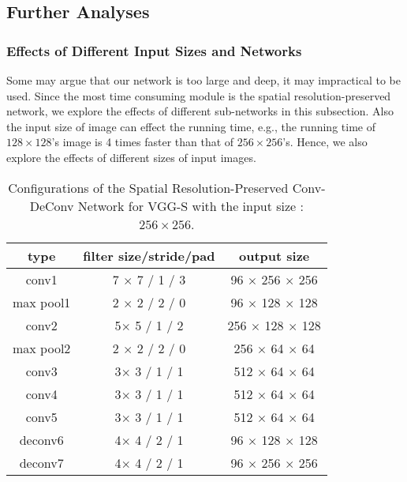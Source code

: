 \documentclass[journal]{IEEEtran}
\begin{document}
\subsection{Further Analyses}

\subsubsection{Effects of Different Input Sizes and Networks}
Some may argue that our network is too large and deep, it may impractical to be used. Since the most time consuming module is the spatial resolution-preserved network, we explore the effects of different sub-networks in this subsection. Also the input size of image can effect the running time, e.g., the running time of $128 \times 128$'s image is 4 times faster than that of $256 \times 256$'s. Hence, we also explore the effects of different sizes of input images.


\begin{table}[t]
    \centering \caption{Configurations of the Spatial Resolution-Preserved Conv-DeConv Network for VGG-S with the input size : $256 \times 256$.}
    \begin{tabular}{|c|c | c |}
        \hline{\bf type} &  {\bf filter size/stride/pad } & {\bf output size} \\
        \hline
         conv1 & 7 $\times$ 7 / 1 / 3 & 96 $\times$ 256 $\times$ 256 \\
           \hline
        max pool1 & 2 $\times$ 2 / 2 / 0  & 96 $\times$ 128 $\times$ 128 \\
         \hline
         conv2 & 5$\times$ 5 / 1 / 2  & 256 $\times$ 128 $\times$ 128 \\
         \hline
        max pool2 & 2 $\times$ 2 / 2 / 0  & 256 $\times$ 64 $\times$ 64 \\
         \hline
         conv3 & 3$\times$ 3 / 1 / 1  & 512 $\times$ 64 $\times$ 64 \\
         \hline
         conv4 & 3$\times$ 3 / 1 / 1  & 512 $\times$ 64 $\times$ 64 \\
         \hline
         conv5 & 3$\times$ 3 / 1 / 1  & 512 $\times$ 64 $\times$ 64 \\
         \hline
         deconv6 & 4$\times$ 4 / 2 / 1 & 96 $\times$ 128 $\times$ 128 \\
         \hline
         deconv7 & 4$\times$ 4 / 2 / 1 & 96 $\times$ 256 $\times$ 256 \\
         \hline
        \end{tabular}
    \label{Network_def}
\end{table}
\end{document}
